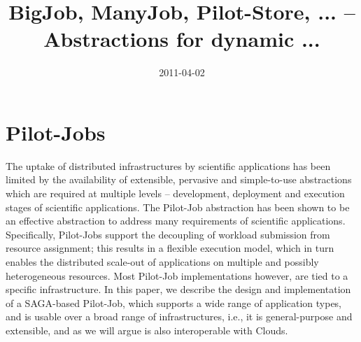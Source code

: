\documentclass[]{article}
\title{BigJob, ManyJob, Pilot-Store, ... -- Abstractions for dynamic ...}
\author{  }
\date{2011-04-02}
\begin{document}
\ifpdf
{}
\else
{}
\fi

\maketitle


\section{Pilot-Jobs}

The uptake of distributed infrastructures by scientific applications has been
limited by the availability of extensible, pervasive and simple-to-use
abstractions which are required at multiple levels – development, deployment
and execution stages of scientific applications. The Pilot-Job abstraction has
been shown to be an effective abstraction to address many requirements of
scientific applications. Specifically, Pilot-Jobs support the decoupling of
workload submission from resource assignment; this results in a flexible
execution model, which in turn enables the distributed scale-out of
applications on multiple and possibly heterogeneous resources. Most Pilot-Job
implementations however, are tied to a specific infrastructure. In this paper,
we describe the design and implementation of a SAGA-based Pilot-Job, which
supports a wide range of application types, and is usable over a broad range
of infrastructures, i.e., it is general-purpose and extensible, and as we will
argue is also interoperable with Clouds.
\end{document}
